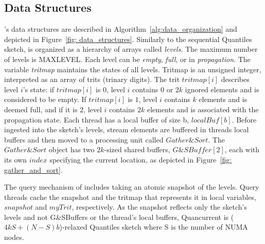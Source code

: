 \subsection{Data Structures}\label{ssec:data_org}
\mysketch's data structures are described in Algorithm~\ref{alg:data_organization} and depicted in Figure~\ref{fig: data_structures}.
Similarly to the sequential Quantiles sketch, \mysketch is organized as a hierarchy of arrays called \emph{levels}. The maximum number of levels is \gls{MAXLEVEL}. Each level can be \emph{empty}, \emph{full}, or in \emph{propagation}. The variable \emph{tritmap} maintains the states of all levels. Tritmap is an unsigned integer, interpreted as an array of trits (trinary digits). The trit $tritmap[i]$ describes level $i$'s state: if $tritmap[i]$ is $0$, level $i$ contains $0$ or $2k$ ignored elements and is considered to be empty. If $tritmap[i]$ is $1$, level $i$ contains $k$ elements and is deemed full, and if it is $2$, level $i$ contains $2k$ elements and is associated with the propagation state. Each thread has a local buffer of size \gls{b}, $\mathit{localBuf[b]}$. Before ingested into the sketch's levels, stream elements are buffered in threads local buffers and then moved to a processing unit called $\mathit{Gather\&Sort}$. The $\mathit{Gather\&Sort}$ object has two $2k$-sized shared buffers, $\mathit{G\&SBuffer}[2]$, each with its own $\mathit{index}$ specifying the current location, as depicted in Figure~\ref{fig: gather_and_sort}. 

The query mechanism of \mysketch includes taking an atomic snapshot of the levels. Query threads cache the snapshot and the tritmap that represents it in local variables, 
$\mathit{snapshot}$ and $\mathit{myTrit}$, respectively. As the snapshot reflects only the sketch's levels and not G\&SBuffers or the thread's local buffers, Quancurrent is ($4kS+(N-S)b$)-relaxed Quantiles sketch where \gls{S} is the number of NUMA nodes. 


